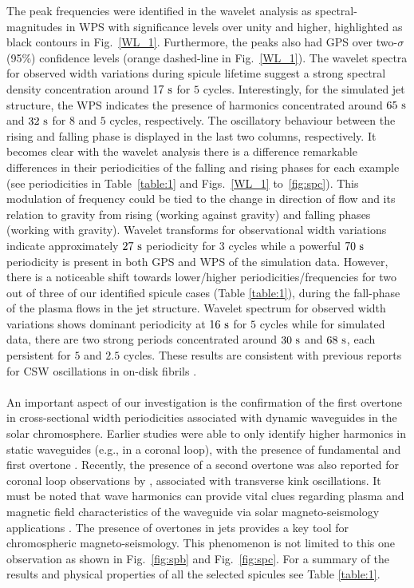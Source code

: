 \documentclass[12pt]{ociamthesis}
\newcommand{\np}{\\ \\}
\begin{document}
The peak frequencies were identified in the wavelet analysis as spectral-magnitudes in WPS with significance levels over unity and higher, highlighted as black contours in Fig.~\ref{WL_1}. Furthermore, the peaks also had GPS over two-$\sigma$ (95\%) confidence levels (orange dashed-line in Fig.~\ref{WL_1}). The wavelet spectra for observed width variations during spicule lifetime suggest a strong spectral density concentration around $17~\rm{s}$ for $5$ cycles. Interestingly, for the simulated jet structure, the WPS indicates the presence of harmonics concentrated around $65~\rm{s}$ and $32~\rm{s}$ for $8$ and $5$ cycles, respectively. The oscillatory behaviour between the rising and falling phase is displayed in the last two columns, respectively. It becomes clear with the wavelet analysis there is a difference remarkable differences in their periodicities of the falling and rising phases for each example (see periodicities in Table~\ref{table:1} and Figs.~\ref{WL_1} to~\ref{fig:spc}). This modulation of frequency could be tied to the change in direction of flow and its relation to gravity from rising (working against gravity) and falling phases (working with gravity). Wavelet transforms for observational width variations indicate approximately $27~\rm{s}$ periodicity for 3 cycles while a powerful $70~\rm{s}$ periodicity is present in both GPS and WPS of the simulation data. However, there is a noticeable shift towards lower/higher periodicities/frequencies for two out of three of our identified spicule cases (Table \ref{table:1}), during the fall-phase of the plasma flows in the jet structure. Wavelet spectrum for observed width variations shows dominant periodicity at $16~\rm{s}$ for $5$ cycles while for simulated data, there are two strong periods concentrated around $30~\rm{s}$ and $68~\rm{s}$, each persistent for $5$ and $2.5$ cycles. These results are consistent with previous reports for CSW oscillations in on-disk fibrils \citep{Gafeira2017}. \np
%
An important aspect of our investigation is the confirmation of the first overtone in cross-sectional width periodicities associated with dynamic waveguides in the solar chromosphere.  Earlier studies were able to only identify higher harmonics in static waveguides (e.g., in a coronal loop), with the presence of fundamental and first overtone \citep{verwichte2004, guo2015}. Recently, the presence of a second overtone was also reported for coronal loop observations by \citet{duckenfield2019}, associated with transverse kink oscillations. It must be noted that wave harmonics can provide vital clues regarding plasma and magnetic field characteristics of the waveguide via solar magneto-seismology applications \citep{andries2005,andries2009}. The presence of overtones in jets provides a key tool for chromospheric magneto-seismology. This phenomenon is not limited to this one observation as shown in Fig.~\ref{fig:spb} and Fig.~\ref{fig:spc}. For a summary of the results and physical properties of all the selected spicules see Table \ref{table:1}. \np 
\end{document}
